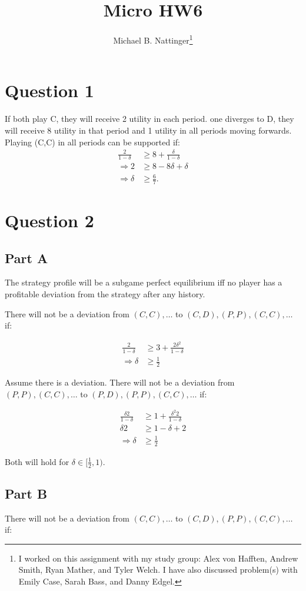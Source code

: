 \documentclass[11pt]{article} %
\title{Micro HW6}
\author{Michael B. Nattinger\footnote{I worked on this assignment with my study group: Alex von Hafften, Andrew Smith, Ryan Mather, and Tyler Welch. I have also discussed problem(s) with Emily Case, Sarah Bass, and Danny Edgel.}}
\begin{document}
\maketitle

\section{Question 1}
If both play C, they will receive 2 utility in each period. one diverges to D, they will receive 8 utility in that period and 1 utility in all periods moving forwards. Playing (C,C) in all periods can be supported if:
\begin{align*}
\frac{2}{1-\delta} &\geq 8+\frac{\delta}{1-\delta}\\
\Rightarrow 2 &\geq 8-8\delta + \delta\\
\Rightarrow \delta &\geq \frac{6}{7}.
\end{align*}

\section{Question 2}
\subsection{Part A}
The strategy profile will be a subgame perfect equilibrium iff no player has a profitable deviation from the strategy after any history. 

There will not be a deviation from $(C,C),\dots$ to $(C,D),(P,P),(C,C),\dots$ if:

\begin{align*}
\frac{2}{1-\delta} &\geq 3+ \frac{2\delta^2 }{1-\delta}\\
\Rightarrow \delta&\geq \frac{1}{2}
\end{align*}

Assume there is a deviation. There will not be a deviation from $(P,P),(C,C),\dots$ to $(P,D),(P,P),(C,C),\dots$ if:

\begin{align*}
\frac{\delta 2}{1-\delta} &\geq 1+\frac{\delta^2 2}{1-\delta}\\
\delta 2 &\geq 1-\delta + 2\\
\Rightarrow  \delta&\geq \frac{1}{2}
\end{align*}

Both will hold for $\delta \in [\frac{1}{2},1)$.
\subsection{Part B}
There will not be a deviation from $(C,C),\dots$ to $(C,D),(P,P),(C,C),\dots$ if:
\end{document}
